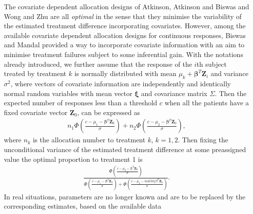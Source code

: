 The covariate dependent allocation designs of
Atkinson\cite{55,56,57}, Atkinson and Biswas\cite{58} and Wong and Zhu\cite{59} are all
\textit{optimal} in the sense that they minimise the variability of
the estimated treatment difference incorporating covariates. However,
among the available covariate dependent allocation designs for
continuous responses,  Biswas and Mandal\cite{44}
provided a way to incorporate covariate
information with an aim to minimise treatment failures subject to some inferential gain. With the notations already introduced, we further assume that the response of the $i$th subject treated by treatment $k$ is normally distributed with
mean $\mu_{k}+\mathbf{\beta}^{T}{\mathbf{Z}}_{i}$ and variance $\sigma^2$, where vectors of covariate information are independently and identically normal random variables with mean vector $\mathbf{\xi}$ and covariance matrix $\Sigma$. Then the expected number of responses less than a threshold $c$ when all the patients have a fixed covariate vector
${\mathbf{Z}}_{0}$, can be expressed as
\begin{eqnarray*}
n_{1}\Phi\left(\frac{c-\mu_{1}-\mathbf{\beta}^{T}{\mathbf{Z}}_{0}}{\sigma}\right)+n_{2}\Phi\left(\frac{c-\mu_{2}-\mathbf{\beta}^{T}{\mathbf{Z}}_{0}}{\sigma}\right),
\end{eqnarray*}
where $n_{k}$ is the allocation number to treatment $k$, $k=1,2$. Then
fixing the unconditional variance of the estimated treatment
difference at some preassigned value the optimal
proportion to treatment 1 is
\begin{eqnarray*}
\frac{{\Phi\left(\frac{c-\mu_{2}-\mathbf{\beta}^{T}{\mathbf{Z}}_{0}}{\sigma}\right)}}{{\Phi\left(\frac{c-\mu_{1}-\mathbf{\beta}^{T}{\mathbf{Z}}_{0}}{\sigma}\right)}+
{\Phi\left(\frac{c-\mu_{2}-mathbf{\beta}^{T}{\mathbf{Z}}_{0}}{\sigma}\right)}}.
\end{eqnarray*}
In real situations, parameters are no longer known and are to be replaced
by the corresponding estimates, based on the available data
